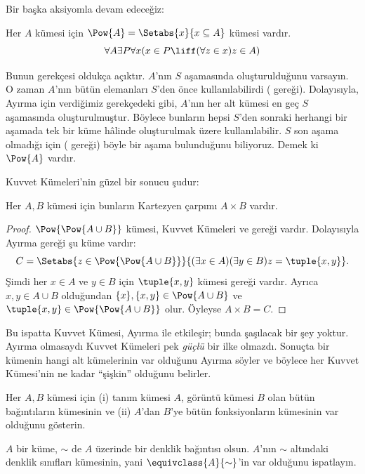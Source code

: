 


Bir başka aksiyomla devam edeceğiz:

\begin{axiom}
Her $A$ kümesi için $\Pow{A} = \Setabs{x}{x \subseteq A}$ kümesi vardır.
\[
	\forall A \exists P \forall x(x \in P \liff (\forall z \in x)z \in A)
\]
\end{axiom}

Bunun gerekçesi oldukça açıktır. $A$'nın $S$ aşamasında oluşturulduğunu
varsayın. O zaman $A$'nın bütün elemanları $S$'den önce kullanılabilirdi
(\stagesacc{} gereği). Dolayısıyla, Ayırma için verdiğimiz gerekçedeki gibi,
$A$'nın her alt kümesi en geç $S$ aşamasında oluşturulmuştur. Böylece
bunların hepsi $S$'den sonraki herhangi bir aşamada tek bir küme hâlinde
oluşturulmak üzere kullanılabilir. $S$ son aşama olmadığı için
(\stagessucc{} gereği) böyle bir aşama bulunduğunu biliyoruz. Demek ki
$\Pow{A}$ vardır.

Kuvvet Kümeleri'nin güzel bir sonucu şudur:

\begin{prop}\label{thm:Products}
Her $A,B$ kümesi için bunların Kartezyen çarpımı $A \times B$ vardır.
\end{prop}

\begin{proof}
$\Pow{\Pow{A \cup B}}$ kümesi, Kuvvet Kümeleri ve
 gereği vardır. Dolayısıyla
Ayırma gereği şu küme vardır:
\[
	C = \Setabs{z \in \Pow{\Pow{A \cup B}}}{(\exists x \in A)(\exists y \in B) z = \tuple{x, y}}.
\]
Şimdi her $x \in A$ ve $y \in B$ için $\tuple{x,y}$ kümesi
 gereği vardır. Ayrıca
$x,y \in A \cup B$ olduğundan $\{x\}, \{x,y\} \in \Pow{A \cup B}$ ve
$\tuple{x,y} \in \Pow{\Pow{A \cup B}}$ olur. Öyleyse $A \times B=C$.
\end{proof}

Bu ispatta Kuvvet Kümesi, Ayırma ile etkileşir; bunda şaşılacak bir şey
yoktur. Ayırma olmasaydı Kuvvet Kümeleri pek \emph{güçlü} bir ilke
olmazdı. Sonuçta bir kümenin hangi alt kümelerinin var olduğunu Ayırma
söyler ve böylece her Kuvvet Kümesi'nin ne kadar ``şişkin'' olduğunu
belirler.

\begin{prob}
Her $A,B$ kümesi için (i) tanım kümesi $A$, görüntü kümesi $B$ olan bütün
bağıntıların kümesinin ve (ii) $A$'dan $B$'ye bütün fonksiyonların kümesinin
var olduğunu gösterin.
\end{prob}

\begin{prob}
$A$ bir küme, $\sim$ de $A$ üzerinde bir denklik bağıntısı olsun. $A$'nın
$\sim$ altındaki denklik sınıfları kümesinin, yani
$\equivclass{A}{\sim}$'in var olduğunu ispatlayın.
\end{prob}

